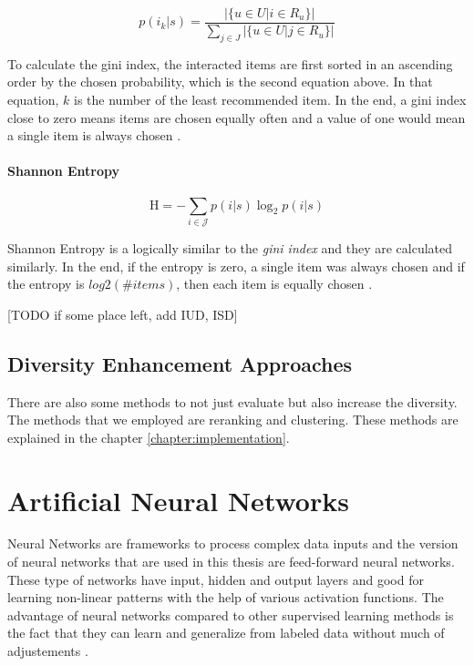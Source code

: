 $$
p ( i_{k} | s ) = \frac { | \{ u \in { U } | i \in R _ { u } \} | } { \sum _ { j \in J } | \{ u \in { U } | j \in R _ { u } \} | }
$$

To calculate the gini index, the interacted items are first sorted in an ascending order by the chosen probability, which is the second equation above. In that equation, $k$ is the number of the least recommended item. In the end, a gini index close to zero means items are chosen equally often and a value of one would mean a single item is always chosen \cite{castells2015novelty}.

\paragraph{Shannon Entropy}

$$
\mathrm { H } = - \sum _ { i \in \mathcal { J } } p ( i | s ) \log _ { 2 } p ( i | s )
$$

Shannon Entropy is a logically similar to the \textit{gini index} and they are calculated similarly. In the end, if the entropy is zero, a single item was always chosen and if the entropy is $log2(\#items)$, then each item is equally chosen \cite{castells2015novelty}.

[TODO if some place left, add IUD, ISD]

\subsection{Diversity Enhancement Approaches}

There are also some methods to not just evaluate but also increase the diversity. The methods that we employed are reranking and clustering. These methods are explained in the chapter \ref{chapter:implementation}.

\section{Artificial Neural Networks}

Neural Networks are frameworks to process complex data inputs and the version of neural networks that are used in this thesis are feed-forward neural networks. These type of networks have input, hidden and output layers and good for learning non-linear patterns with the help of various activation functions. The advantage of neural networks compared to other supervised learning methods is the fact that they can learn and generalize from labeled data without much of adjustements \cite{maind2014research}.

